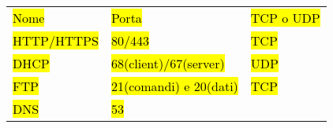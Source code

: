 \begin{longtable}[]{@{}
  >{\raggedright\arraybackslash}p{}
  >{\raggedright\arraybackslash}p{}
  >{\raggedright\arraybackslash}p{}@{}}
\toprule\noalign{}
\begin{minipage}[b]{\linewidth}\centering
\hl{Nome}
\end{minipage} & \begin{minipage}[b]{\linewidth}\centering
\hl{Porta}
\end{minipage} & \begin{minipage}[b]{\linewidth}\centering
\hl{TCP o UDP}
\end{minipage} \\
\begin{minipage}[b]{\linewidth}\raggedright
\hl{HTTP/HTTPS}
\end{minipage} & \begin{minipage}[b]{\linewidth}\raggedright
\hl{80/443}
\end{minipage} & \begin{minipage}[b]{\linewidth}\raggedright
\hl{TCP}
\end{minipage} \\
\begin{minipage}[b]{\linewidth}\raggedright
\hl{DHCP}
\end{minipage} & \begin{minipage}[b]{\linewidth}\raggedright
\hl{68(client)/67(server)}
\end{minipage} & \begin{minipage}[b]{\linewidth}\raggedright
\hl{UDP}
\end{minipage} \\
\begin{minipage}[b]{\linewidth}\raggedright
\hl{FTP}
\end{minipage} & \begin{minipage}[b]{\linewidth}\raggedright
\hl{21(comandi) e 20(dati)}
\end{minipage} & \begin{minipage}[b]{\linewidth}\raggedright
\hl{TCP}
\end{minipage} \\
\begin{minipage}[b]{\linewidth}\raggedright
\hl{DNS}
\end{minipage} & \begin{minipage}[b]{\linewidth}\raggedright
\hl{53}
\end{minipage} & \begin{minipage}[b]{\linewidth}\raggedright

\end{minipage}
\end{longtable}
